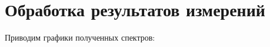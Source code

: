 \newpage
\setcounter{page}{11}
\section{Обработка результатов измерений}

Приводим графики полученных спектров:

\begin{figure}[h!]
	\label{fig:image}
\end{figure}

\begin{figure}[h!]
	\label{fig:image}
\end{figure}

\begin{figure}[h!]
	\label{fig:image}
\end{figure}


